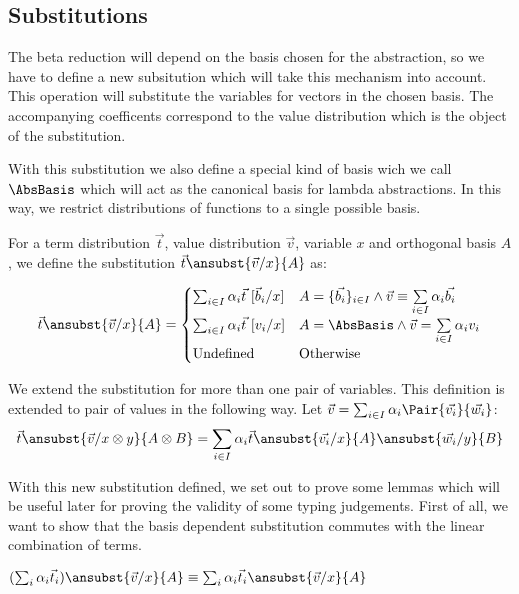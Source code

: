 \subsection{Substitutions}

The beta reduction will depend on the basis chosen for the abstraction, so we have to define a new subsitution which will take this mechanism into account. This operation will substitute the variables for vectors in the chosen basis. The accompanying coefficents correspond to the value distribution which is the object of the substitution.
  
With this substitution we also define a special kind of basis wich we call $\AbsBasis$ which will act as the canonical basis for lambda abstractions. In this way, we restrict distributions of functions to a single possible basis.

\begin{definition}
  For a term distribution $\vec{t}$, value distribution $\vec{v}$, variable $x$ and orthogonal basis $A$, we define the substitution $\vec{t}\ansubst{\vec{v}/x}{A}$ as:
  
  \[
  \vec{t}\ansubst{\vec{v}/x}{A} = 
    \begin{cases}
      \sum_{i\in I} \alpha_i \vec t\ [\vec b_i / x] 
      & A=\{\vec{b_i}\}_{i\in I}\wedge\vec{v}\equiv\sum\limits_{i\in I} \alpha_i \vec{b_i} \\
      \sum_{i\in I}\alpha_i\vec{t}\ [v_i/x] & A = \AbsBasis\wedge\vec{v}=\sum\limits_{i\in I}\alpha_i v_i\\
      \text{Undefined} & \text{Otherwise}
    \end{cases}
  \]

  We extend the substitution for more than one pair of variables. This definition is extended to pair of values in the following way. Let $\vec v = \sum_{i\in I} \alpha_i \Pair{\vec{v_i}}{\vec{w_i}}$:
  \[
    \vec t\ansubst{\vec{v}/x\otimes y}{A \otimes B} = \sum_{i\in I} \alpha_i \vec t\ansubst{\vec{v_i}/x}{A}\ansubst{\vec{w_i}/y}{B}
  \]
\end{definition}

With this new substitution defined, we set out to prove some lemmas which will be useful later for proving the validity of some typing judgements. First of all, we want to show that the basis dependent substitution commutes with the linear combination of terms.

\begin{lemma}\label{lem:distributiveSubstitution}
  $(\sum_i \alpha_i\vec t_i)\ansubst{\vec v/x}{A} \equiv \sum_i \alpha_i\vec t_i \ansubst{\vec v/x}{A}$ 
\end{lemma}

